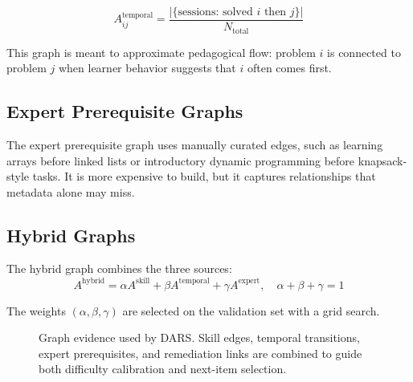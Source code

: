 \documentclass[conference]{IEEEtran}
\begin{document}
\begin{equation}
A_{ij}^{\text{temporal}} = \frac{|\{\text{sessions: solved } i \text{ then } j\}|}{N_{\text{total}}}
\end{equation}

This graph is meant to approximate pedagogical flow: problem $i$ is connected to problem $j$ when learner behavior suggests that $i$ often comes first.

\subsection{Expert Prerequisite Graphs}

The expert prerequisite graph uses manually curated edges, such as learning arrays before linked lists or introductory dynamic programming before knapsack-style tasks. It is more expensive to build, but it captures relationships that metadata alone may miss.

\subsection{Hybrid Graphs}

The hybrid graph combines the three sources:
\begin{equation}
A^{\text{hybrid}} = \alpha A^{\text{skill}} + \beta A^{\text{temporal}} + \gamma A^{\text{expert}}, \quad \alpha + \beta + \gamma = 1
\end{equation}

The weights $(\alpha, \beta, \gamma)$ are selected on the validation set with a grid search.

\begin{figure}[t]
\centering
{}
\caption{Graph evidence used by DARS. Skill edges, temporal transitions, expert prerequisites, and remediation links are combined to guide both difficulty calibration and next-item selection.}
\label{fig:graph-evidence}
\end{figure}
\end{document}
